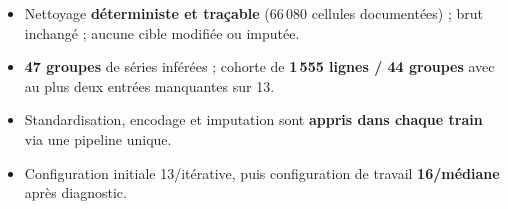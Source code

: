 \begin{aretenir}
\begin{itemize}[leftmargin=1.2em]
  \item Nettoyage \textbf{déterministe et traçable} (66\,080 cellules documentées) ; brut inchangé ; aucune cible modifiée ou imputée.
  \item \textbf{47 groupes} de séries inférées ; cohorte de \textbf{1\,555 lignes / 44 groupes} avec au plus deux entrées manquantes sur 13.
  \item Standardisation, encodage et imputation sont \textbf{appris dans chaque train} via une pipeline unique.
  \item Configuration initiale 13/itérative, puis configuration de travail \textbf{16/médiane} après diagnostic.
\end{itemize}
\end{aretenir}
